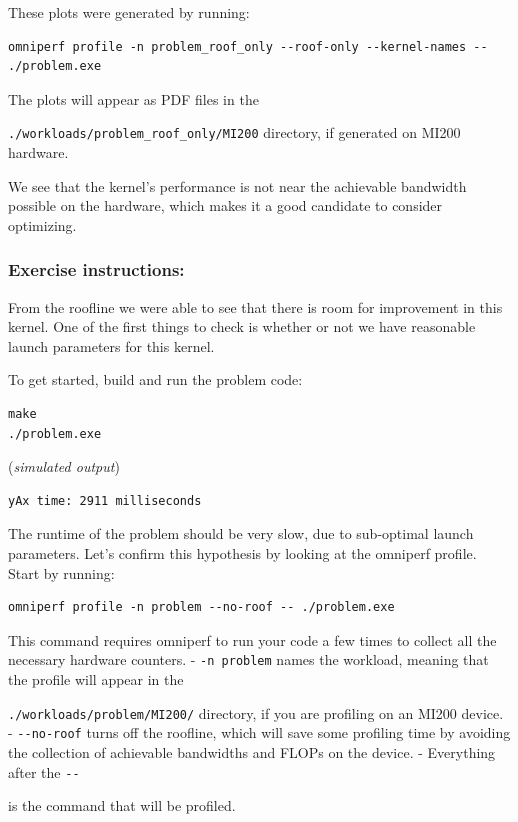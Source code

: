 \documentclass[
]{article}
\let\oldtexttt\texttt
\renewcommand{\texttt}[1]{
  \colorbox{Light}{\oldtexttt{#1}}
}
\begin{document}
These plots were generated by running:

\begin{Verbatim}
omniperf profile -n problem_roof_only --roof-only --kernel-names -- ./problem.exe
\end{Verbatim}

The plots will appear as PDF files in the
\texttt{./workloads/problem\_roof\_only/MI200} directory, if generated
on MI200 hardware.

We see that the kernel's performance is not near the achievable
bandwidth possible on the hardware, which makes it a good candidate to
consider optimizing.

\hypertarget{exercise-instructions}{%
\subsubsection{Exercise instructions:}\label{exercise-instructions}}

From the roofline we were able to see that there is room for improvement
in this kernel. One of the first things to check is whether or not we
have reasonable launch parameters for this kernel.

To get started, build and run the problem code:

\begin{Verbatim}
make
./problem.exe
\end{Verbatim}

(\emph{simulated output})

\begin{Verbatim}
yAx time: 2911 milliseconds
\end{Verbatim}

The runtime of the problem should be very slow, due to sub-optimal
launch parameters. Let's confirm this hypothesis by looking at the
omniperf profile. Start by running:

\begin{Verbatim}
omniperf profile -n problem --no-roof -- ./problem.exe
\end{Verbatim}

This command requires omniperf to run your code a few times to collect
all the necessary hardware counters. - \texttt{-n\ problem} names the
workload, meaning that the profile will appear in the
\texttt{./workloads/problem/MI200/} directory, if you are profiling on
an MI200 device. - \texttt{-\/-no-roof} turns off the roofline, which
will save some profiling time by avoiding the collection of achievable
bandwidths and FLOPs on the device. - Everything after the \texttt{-\/-}
is the command that will be profiled.
\end{document}
